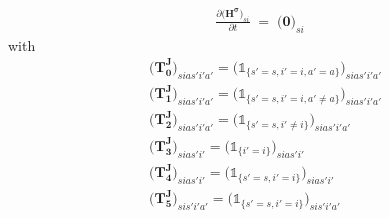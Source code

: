 \documentclass[11pt,fleqn]{article}
\newcommand{\bzero}{\bm{0}}
\newcommand{\id}{\mathds{1}}
\begin{document}
\begin{align*}
	\frac{ \partial \biggl( \bm{H^{\sigma}} \biggr)_{si} }{ \partial t } \;=\; \biggl( \bzero \biggr)_{si}
\end{align*}
with
\begin{align*}
	& \biggl( \bm{T_0^J} \biggr)_{sias'i'a'} = \biggl( \id_{\{s'=s,i'=i,a'=a\}} \biggr)_{sias'i'a'} \\
	& \biggl( \bm{T_1^J} \biggr)_{sias'i'a'} = \biggl( \id_{\{s'=s,i'=i,a'\neq a\}} \biggr)_{sias'i'a'} \\
	& \biggl( \bm{T_2^J} \biggr)_{sias'i'a'} = \biggl( \id_{\{s'=s,i'\neq i\}} \biggr)_{sias'i'a'} \\
	& \biggl( \bm{T_3^J} \biggr)_{sias'i'} = \biggl( \id_{\{i'=i\}} \biggr)_{sias'i'} \\
	& \biggl( \bm{T_4^J} \biggr)_{sias'i'} = \biggl( \id_{\{s'=s,i'=i\}} \biggr)_{sias'i'} \\
	& \biggl( \bm{T_5^J} \biggr)_{sis'i'a'} = \biggl( \id_{\{s'=s,i'=i\}} \biggr)_{sis'i'a'}
\end{align*}






\newpage

\end{document}

